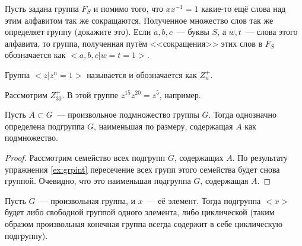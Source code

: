 Пусть задана группа $F_S$ и помимо того, что $xx^{-1}=1$ какие-то ещё слова над этим алфавитом так же сокращаются. Полученное множество слов так же определяет группу (докажите это). Если $a, b, c$~--- буквы $S$, а $w, t$~--- слова этого алфавита, то группа, полученная путём <<сокращения>> этих слов в $F_S$ обозначается как $<a, b, c | w = t = 1>$.

\begin{example}
	Группа $<z|z^n = 1>$ называется  и обозначается как $Z_n^+$.
\end{example}

\begin{example}
	Рассмотрим $Z_{30}^+$. В этой группе $z^{15}z^{20} = z^5$, например.
\end{example}

\begin{thm}
	Пусть $A\subset G$~--- произвольное подмножество группы $G$. Тогда однозначно определена подгруппа $G$, наименьшая по размеру, содержащая $A$ как подмножество.
\end{thm}
\begin{proof}
	Рассмотрим семейство всех подгрупп $G$, содержащих $A$. По результату упражнения \ref{ex:grpint} пересечение всех групп этого семейства будет снова группой. Очевидно, что это наименьшая подгруппа $G$, содержащая $A$.
\end{proof}

\begin{thm}
	Пусть $G$~--- произвольная группа, и $x$~--- её элемент. Тогда подгруппа $<x>$ будет либо свободной группой одного элемента, либо циклической (таким образом произвольная конечная группа всегда содержит в себе циклическую подгруппу).
\end{thm}